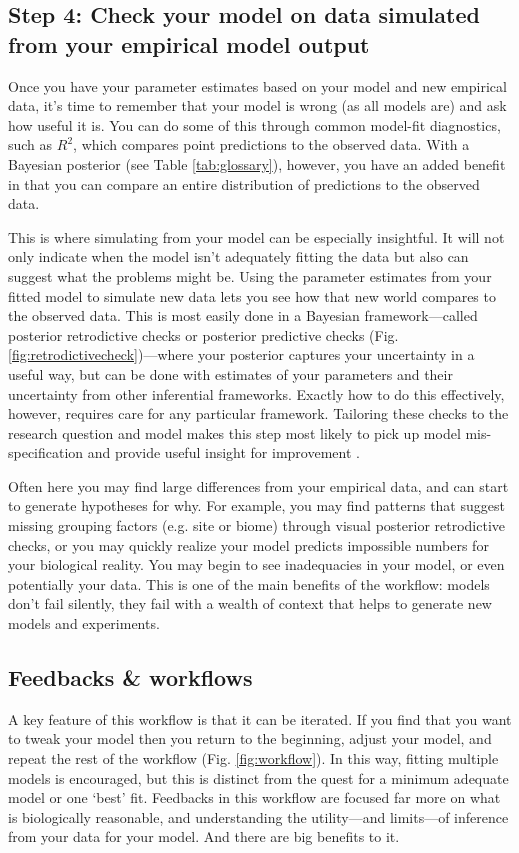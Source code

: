 \documentclass[11pt]{article}
\begin{document}
\subsection*{Step 4: Check your model on data simulated from your empirical model output} 

Once you have your parameter estimates based on your model and new empirical data, it's time to remember that your model is wrong (as all models are) and ask how useful it is. You can do some of this through common model-fit diagnostics, such as $R^2$, which compares point predictions to the observed data. With a Bayesian posterior (see Table \ref{tab:glossary}), however, you have an added benefit in that you can compare an entire distribution of predictions to the observed data. 

This is where simulating from your model can be especially insightful. It will not only indicate when the model isn't adequately fitting the data but also can suggest what the problems might be. Using the parameter estimates from your fitted model to simulate new data \citep[][]{held2010,gelman200ppc,conn2018} lets you see how that new world compares to the observed data. This is most easily done in a Bayesian framework---called posterior retrodictive checks or posterior predictive checks (Fig. \ref{fig:retrodictivecheck})---where your posterior captures your uncertainty in a useful way, but can be done with estimates of your parameters and their uncertainty from other inferential frameworks. Exactly how to do this effectively, however, requires care for any particular framework. Tailoring these checks to the research question and model makes this step most likely to pick up model mis-specification and provide useful insight for improvement \citep[e.g.,][]{mimno2015posterior}.


Often here you may find large differences from your empirical data, and can start to generate hypotheses for why. For example, you may find patterns that suggest missing grouping factors (e.g. site or biome) through visual posterior retrodictive checks, or you may quickly realize your model predicts impossible numbers for your biological reality. You may begin to see inadequacies in your model, or even potentially your data.  This is one of the main benefits of the workflow: models don't fail silently, they fail with a wealth of context that helps to generate new models and experiments.


\subsection*{Feedbacks \& workflows}
A key feature of this workflow is that it can be iterated.  If you find that you want to tweak your model then you return to the beginning, adjust your model, and repeat the rest of the workflow (Fig. \ref{fig:workflow}). In this way, fitting multiple models is encouraged, but this is distinct from the quest for a minimum adequate model or one `best' fit. Feedbacks in this workflow are focused far more on what is biologically reasonable, and understanding the utility---and limits---of inference from your data for your model.  And there are big benefits to it. 
\end{document}
